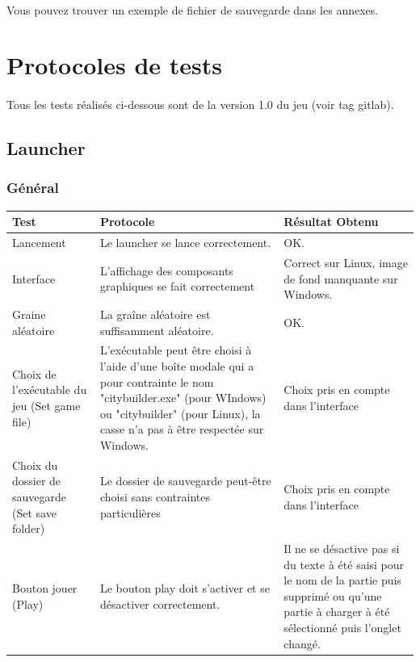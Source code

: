 \documentclass[a4paper,10pt,openany,oneside]{report}
\begin{document}
\paragraph{}
Vous pouvez trouver un exemple de fichier de sauvegarde dans les annexes.

\section{Protocoles de tests}
\thispagestyle{headings}
\paragraph{}
Tous les tests réalisés ci-dessous sont de la version 1.0 du jeu (voir tag gitlab).
\subsection{Launcher}

\subsubsection{Général}
\begin{center}
	\begin{tabular}{| p{3cm} | p{6cm} | p{6cm} |}
	\hline
		 \textbf{Test} & \textbf{Protocole} & \textbf{Résultat Obtenu}
		 \\ \hline
		 Lancement & Le launcher se lance correctement. & OK.
		 \\ \hline
		 Interface & L'affichage des composants graphiques se fait correctement & Correct sur Linux, image de fond manquante sur Windows.
		 \\ \hline
		 Graine aléatoire & La graîne aléatoire est suffisamment aléatoire. & OK.
		 \\ \hline
		Choix de l'exécutable du jeu (Set game file)&
		L'exécutable peut être choisi à l'aide d'une boîte modale qui a pour contrainte le nom "citybuilder.exe" (pour WIndows) ou "citybuilder" (pour Linux), la casse n'a pas à être respectée sur Windows. &
		Choix pris en compte dans l'interface
		\\ \hline
		Choix du dossier de sauvegarde (Set save folder) &
		Le dossier de sauvegarde peut-être choisi sans contraintes particulières &
		Choix pris en compte dans l'interface
		\\ \hline
		Bouton jouer (Play) &
		Le bouton play doit s'activer et se désactiver correctement. &
		Il ne se désactive pas si du texte à été saisi pour le nom de la partie puis supprimé ou qu'une partie à charger à été sélectionné puis l'onglet changé.
		\\ \hline
	\end{tabular}
\end{center}
\end{document}

